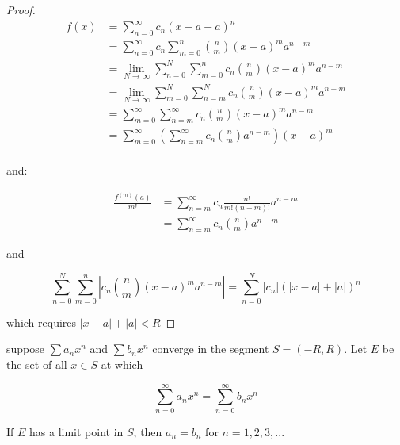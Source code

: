 \begin{proof}
    \begin{align*}
        f(x) &= \sum_{n=0}^{\infty} c_n(x-a + a)^n \\
        &=\sum_{n=0}^{\infty} c_n \sum_{m=0}^{n}\binom{n}{m}(x-a)^ma^{n-m}  \\
        &= \lim_{N \to \infty}\sum_{n=0}^{N}\sum_{m=0}^{n} c_n \binom{n}{m}(x-a)^ma^{n-m} \\
        &= \lim_{N \to \infty}\sum_{m=0}^{N}\sum_{n=m}^{N} c_n \binom{n}{m}(x-a)^ma^{n-m} \\ 
        &= \sum_{m=0}^{\infty}\sum_{n=m}^{\infty} c_n \binom{n}{m}(x-a)^ma^{n-m} \\ 
        &= \sum_{m=0}^{\infty}\left(\sum_{n=m}^{\infty} c_n \binom{n}{m} a^{n-m} \right)(x-a)^m \\ 
    \end{align*}

    and:

    \begin{align*}
        \frac{f^{(m)}(a)}{m!} &= \sum_{n=m}^{\infty} c_n\frac{n!}{m!(n-m)!}a^{n-m} \\
        &= \sum_{n=m}^{\infty} c_n\binom{n}{m}a^{n-m}
    \end{align*}

    and

    \[
        \sum_{n=0}^{N}\sum_{m=0}^{n} \left| c_n \binom{n}{m}(x-a)^ma^{n-m} \right| = \sum_{n=0}^{N}|c_n| (|x-a| + |a|)^n
    \]

    which requires $|x-a| + |a| < R$
\end{proof}

\begin{thm}
    suppose $\sum a_n x^n$ and $\sum b_n x^n$ converge in the segment $S=(-R,R)$.
    Let $E$ be the set of all $x \in S$ at which

    \[
        \sum_{n=0}^{\infty}a_nx^n =\sum_{n=0}^{\infty}b_nx^n
    \]

    If $E$ has a limit point in $S$, then $a_n = b_n$ for $n=1,2,3,...$
\end{thm}

